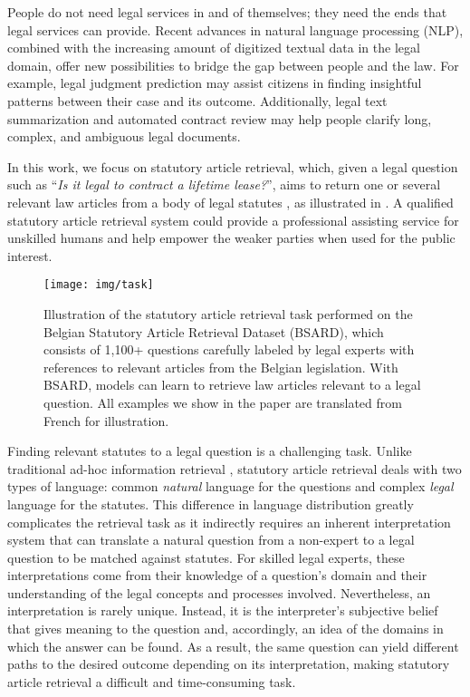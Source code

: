 \documentclass[11pt]{article}
\begin{document}
People do not need legal services in and of themselves; they need the ends that legal services can provide. Recent advances in natural language processing (NLP), combined with the increasing amount of digitized textual data in the legal domain, offer new possibilities to bridge the gap between people and the law. For example, legal judgment prediction \citep{aletras2016predicting,luo2017learning,zhong2018legal,hu2018few,chen2019charge} may assist citizens in finding insightful patterns between their case and its outcome. Additionally, legal text summarization \citep{hachey2006extractive,bhattacharya2019comparative} and automated contract review \citep{harkous2018polisis,lippi2019claudette} may help people clarify long, complex, and ambiguous legal documents. 

In this work, we focus on statutory article retrieval, which, given a legal question such as “\textsl{Is it legal to contract a lifetime lease?}”, aims to return one or several relevant law articles from a body of legal statutes \citep{kim2019statute,nguyen2020jnlp}, as illustrated in . A qualified statutory article retrieval system could provide a professional assisting service for unskilled humans and help empower the weaker parties when used for the public interest.

\begin{figure*}[t]
    \centering
    \texttt{[image: img/task]}
    \caption{Illustration of the statutory article retrieval task performed on the Belgian Statutory Article Retrieval Dataset (BSARD), which consists of 1,100+ questions carefully labeled by legal experts with references to relevant articles from the Belgian legislation. With BSARD, models can learn to retrieve law articles relevant to a legal question. All examples we show in the paper are translated from French for illustration.}
    \label{fig:task}
\end{figure*}

Finding relevant statutes to a legal question is a challenging task. Unlike traditional ad-hoc information retrieval \citep{craswell2020overview}, statutory article retrieval deals with two types of language: common \textit{natural} language for the questions and complex \textit{legal} language for the statutes. This difference in language distribution greatly complicates the retrieval task as it indirectly requires an inherent interpretation system that can translate a natural question from a non-expert to a legal question to be matched against statutes. For skilled legal experts, these interpretations come from their knowledge of a question’s domain and their understanding of the legal concepts and processes involved. Nevertheless, an interpretation is rarely unique. Instead, it is the interpreter’s subjective belief that gives meaning to the question and, accordingly, an idea of the domains in which the answer can be found. As a result, the same question can yield different paths to the desired outcome depending on its interpretation, making statutory article retrieval a difficult and time-consuming task. 
\end{document}
